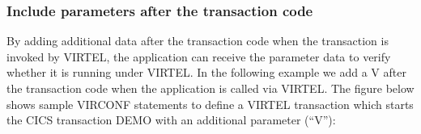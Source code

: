 \documentclass[letterpaper,10pt,english]{sphinxmanual}
\begin{document}
\begin{sphinxVerbatim}[commandchars=\\\{\}]
 

         
            
        

   

      
       
       
\end{sphinxVerbatim}



\subsubsection{Include parameters after the transaction code}
\label{\detokenize{User_Guide:include-parameters-after-the-transaction-code}}
By adding additional data after the transaction code when the transaction is invoked by VIRTEL, the application can
receive the parameter data to verify whether it is running under VIRTEL. In the following example we add a V after the
transaction code when the application is called via VIRTEL.
The figure below shows sample VIRCONF statements to define a VIRTEL transaction which starts the CICS transaction
DEMO with an additional parameter (“V”):
\end{document}
